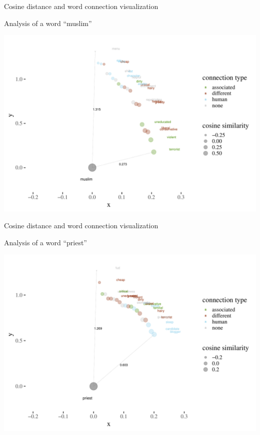 \documentclass[
  10pt,
  ignorenonframetext,
  x11names, dvipsnames, bibspacing,natbib]{beamer}
\begin{document}
\begin{frame}{Cosine distance and word connection visualization}
\protect\hypertarget{cosine-distance-and-word-connection-visualization}{}
\begin{block}{Analysis of a word ``muslim''}
\protect\hypertarget{analysis-of-a-word-muslim}{}
\begin{center}\includegraphics[width=1.05\linewidth]{presentationESSLLI_files/figure-beamer/unnamed-chunk-2-1} \end{center}
\end{block}
\end{frame}

\begin{frame}{Cosine distance and word connection visualization}
\protect\hypertarget{cosine-distance-and-word-connection-visualization-1}{}
\begin{block}{Analysis of a word ``priest''}
\protect\hypertarget{analysis-of-a-word-priest}{}
\begin{center}\includegraphics[width=1.05\linewidth]{presentationESSLLI_files/figure-beamer/unnamed-chunk-3-1} \end{center}
\end{block}
\end{frame}
\end{document}
